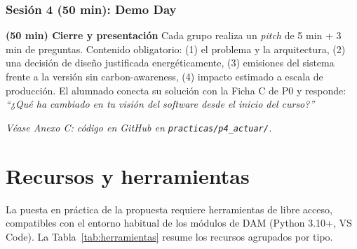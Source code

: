 \subsubsection{Sesión 4 (50 min): Demo Day}


\textbf{(50 min) Cierre y presentación} Cada grupo realiza un \textit{pitch} de 5 min + 3 min de preguntas. Contenido obligatorio: (1) el problema y la arquitectura, (2) una decisión de diseño justificada energéticamente, (3) emisiones del sistema frente a la versión sin carbon-awareness, (4) impacto estimado a escala de producción. El alumnado conecta su solución con la Ficha C de P0 y responde: \textit{``¿Qué ha cambiado en tu visión del software desde el inicio del curso?''}


\textit{Véase Anexo C: código en GitHub en \texttt{practicas/p4\_actuar/}.}


\section{Recursos y herramientas}
\label{sec:herramientas}

La puesta en práctica de la propuesta requiere herramientas de libre acceso, compatibles con el entorno habitual de los módulos de DAM (Python 3.10+, VS Code). La Tabla~\ref{tab:herramientas} resume los recursos agrupados por tipo.

